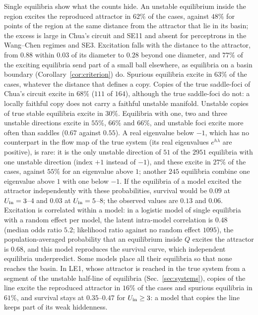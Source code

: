 Single equilibria show what the counts hide. An unstable equilibrium inside the region excites the reproduced attractor in
$62\%$ of the cases, against $48\%$ for points of the region at the same distance from the attractor that lie in its basin;
the excess is large in Chua's circuit and SE11 and absent for perceptrons in the Wang--Chen regimes and SE3. Excitation
falls with the distance to the attractor, from $0.88$ within $0.03$ of its diameter to $0.28$ beyond one diameter, and
$77\%$ of the exciting equilibria send part of a small ball elsewhere, as equilibria on a basin boundary
(Corollary~\ref{cor:criterion}) do. Spurious equilibria excite in $63\%$ of the cases, whatever the distance that defines a
copy. Copies of the true saddle-foci of Chua's circuit excite in $68\%$ ($111$ of $164$), although the true saddle-foci do
not: a locally faithful copy does not carry a faithful unstable manifold. Unstable copies of true stable equilibria excite
in $30\%$. Equilibria with one, two and three unstable directions excite in $55\%$, $66\%$ and $66\%$, and unstable foci
excite more often than saddles ($0.67$ against $0.55$). A real eigenvalue below $-1$, which has no counterpart in the flow map of the
true system (its real eigenvalues $e^{h\lambda}$ are positive), is rare: it is the only unstable direction of $51$ of the
$2951$ equilibria with one unstable direction (index $+1$ instead of $-1$), and these excite in $27\%$ of the cases, against
$55\%$ for an eigenvalue above $1$; another $245$ equilibria combine one eigenvalue above $1$ with one below $-1$. If the
equilibria of a model excited the attractor independently with these probabilities, survival would be $0.09$ at
$U_{\mathrm{in}}=3$--$4$ and $0.03$ at $U_{\mathrm{in}}=5$--$8$; the observed values are $0.13$ and $0.06$. Excitation is correlated within a
model: in a logistic model of single equilibria with a random effect per model, the latent intra-model correlation is
$0.48$ (median odds ratio $5.2$; likelihood ratio against no random effect $1095$), the population-averaged probability that
an equilibrium inside $Q$ excites the attractor is $0.68$, and this model reproduces the survival curve, which independent
equilibria underpredict. Some models place all their equilibria so that none reaches the basin. In LE1, whose attractor is reached in the true system from a segment of the unstable half-line
of equilibria (Sec.~\ref{sec:systems}), copies of the line excite the reproduced attractor in $16\%$ of the cases and
spurious equilibria in $61\%$, and survival stays at $0.35$--$0.47$ for $U_{\mathrm{in}}\ge3$: a model that copies the line keeps
part of its weak hiddenness.

